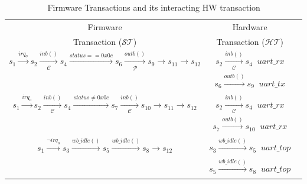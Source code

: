 \documentclass[sigconf]{acmart}
\begin{document}
\begin{table}
\begin{center}
{
 \scriptsize
\begin{tabular}{|c|c|c|}
\hline
  Firmware & Hardware  \\
  Transaction ($\mathcal{ST}$) & Transaction ($\mathcal{HT}$) \\ 
\cline{1-2}
   $s_1 \xrightarrow[]{irq_o} s_2 \xrightarrow[\mathcal{C}]{inb()} s_4
   \xrightarrow[]{status == 0x0c} s_6 \xrightarrow[\mathcal{P}]{outb()} s_9 \rightarrow
   s_{11} \rightarrow s_{12}$  & $s_2 \xrightarrow[\mathcal{C}]{inb()} s_4\;\; uart\_{rx}$
   \\ 
   & $s_6 \xrightarrow[]{outb()} s_9\;\; uart\_{tx}$ \\  \hline
   
   $s_1 \xrightarrow[]{irq_o} s_2 \xrightarrow[\mathcal{C}]{inb()} s_4
   \xrightarrow[]{status \neq 0x0c} s_7 \xrightarrow[\mathcal{C}]{inb()} s_{10} \rightarrow
   s_{11} \rightarrow s_{12}$  & $s_2 \xrightarrow[\mathcal{C}]{inb()} s_4\;\; uart\_{rx}$
   \\ 
   & $s_7 \xrightarrow[]{outb()} s_{10}\;\; uart\_{rx}$ \\  \hline
   
   $s_1 \xrightarrow[]{\neg irq_o} s_3 \xrightarrow[]{wb\_{idle()}}
   s_5 \xrightarrow[]{wb\_{idle()}} s_8 \rightarrow
   s_{12}$ & $s_3 \xrightarrow[]{wb\_{idle()}} s_5\;\; uart\_{top}$ \\ 
   & $s_5 \xrightarrow[]{wb\_{idle()}} s_8\;\; uart\_{top}$ \\  \hline
\end{tabular}
}
\end{center}
\caption{Firmware Transactions and its interacting HW transaction}
\label{transaction}
\end{table}  
%
\end{document}
